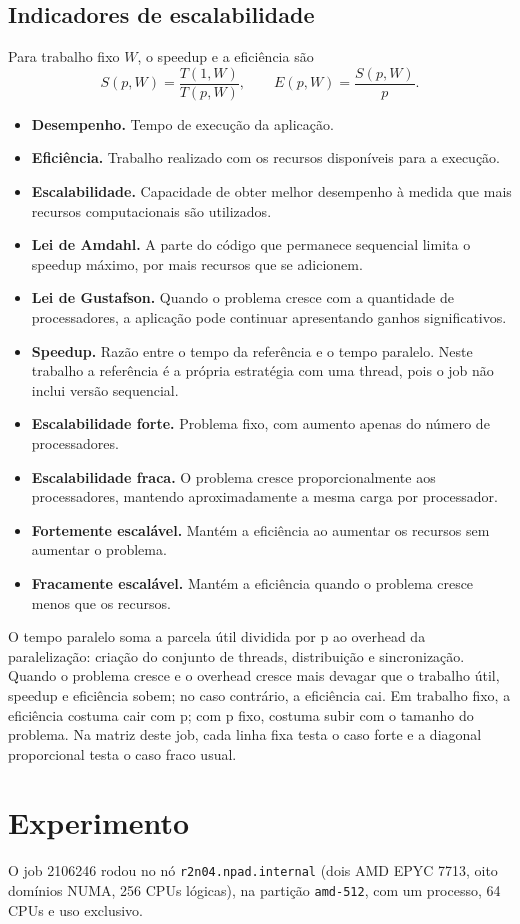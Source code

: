 \documentclass[11pt,letterpaper]{article}
\begin{document}
\subsection{Indicadores de escalabilidade}
Para trabalho fixo $W$, o speedup e a eficiência são
\[
S(p,W)=\frac{T(1,W)}{T(p,W)},\qquad E(p,W)=\frac{S(p,W)}{p}.
\]
\begin{itemize}
\item \textbf{Desempenho.} Tempo de execução da aplicação.
\item \textbf{Eficiência.} Trabalho realizado com os recursos disponíveis para a execução.
\item \textbf{Escalabilidade.} Capacidade de obter melhor desempenho à medida que mais recursos computacionais são utilizados.
\item \textbf{Lei de Amdahl.} A parte do código que permanece sequencial limita o speedup máximo, por mais recursos que se adicionem.
\item \textbf{Lei de Gustafson.} Quando o problema cresce com a quantidade de processadores, a aplicação pode continuar apresentando ganhos significativos.
\item \textbf{Speedup.} Razão entre o tempo da referência e o tempo paralelo. Neste trabalho a referência é a própria estratégia com uma thread, pois o job não inclui versão sequencial.
\item \textbf{Escalabilidade forte.} Problema fixo, com aumento apenas do número de processadores.
\item \textbf{Escalabilidade fraca.} O problema cresce proporcionalmente aos processadores, mantendo aproximadamente a mesma carga por processador.
\item \textbf{Fortemente escalável.} Mantém a eficiência ao aumentar os recursos sem aumentar o problema.
\item \textbf{Fracamente escalável.} Mantém a eficiência quando o problema cresce menos que os recursos.
\end{itemize}
O tempo paralelo soma a parcela útil dividida por p ao overhead da paralelização: criação do conjunto de threads, distribuição e sincronização. Quando o problema cresce e o overhead cresce mais devagar que o trabalho útil, speedup e eficiência sobem; no caso contrário, a eficiência cai. Em trabalho fixo, a eficiência costuma cair com p; com p fixo, costuma subir com o tamanho do problema. Na matriz deste job, cada linha fixa testa o caso forte e a diagonal proporcional testa o caso fraco usual.

\section{Experimento}
O job 2106246 rodou no nó \texttt{r2n04.npad.internal} (dois AMD EPYC 7713, oito domínios NUMA, 256 CPUs lógicas), na partição \texttt{amd-512}, com um processo, 64 CPUs e uso exclusivo.
\end{document}
